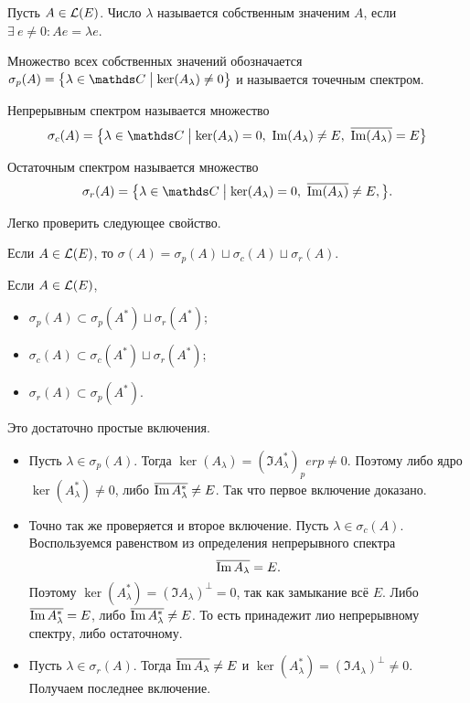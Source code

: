 \begin{Def}
  Пусть $A\in\mathcal L(E)$. Число $\lambda$ называется собственным значеним $A$, если $\exists\ e\ne 0\colon Ae = \lambda e$.

Множество всех собственных значений обозначается $\sigma_p(A) = \big\{\lambda\in\C\bigm| \ker(A_\lambda)\ne0\big\}$ и называется точечным спектром.

Непрерывным спектром называется множество
\[
  \sigma_c(A) = \big\{\lambda\in\C\bigm|
	\ker(A_\lambda)=0,\ 
	\Im(A_\lambda)\ne E,\ 
	\ol{\Im(A_\lambda)} = E\big\}
\]

Остаточным спектром называется множество
\[
  \sigma_r(A) = \big\{\lambda\in\C\bigm|
	\ker(A_\lambda)=0,\ 
	\ol{\Im(A_\lambda)}\ne E,\big\}.
\]
\end{Def}

Легко проверить следующее свойство.
\begin{Ut}
  Если $A\in \mathcal L(E)$, то $\sigma(A) = \sigma_p(A)\sqcup \sigma_c(A)\sqcup \sigma_r(A)$.
\end{Ut}

\begin{Ut}
  Если $A\in\mathcal L(E)$, 
\begin{itemize}
\item 
$\sigma_p(A)\subset \sigma_p(A^*)\sqcup \sigma_r(A^*)$;
\item 
$\sigma_c(A)\subset \sigma_c(A^*)\sqcup \sigma_r(A^*)$;
\item $\sigma_r(A)\subset \sigma_p(A^*)$.
\end{itemize}
\end{Ut}
\begin{Proof}
  Это достаточно простые включения.
\begin{itemize}
\item Пусть $\lambda\in \sigma_p(A)$. Тогда $\ker(A_\lambda) = (\Im A^*_\lambda)_perp\ne0$. Поэтому либо ядро $\ker(A^*_\lambda) \ne 0$, либо $\overline{\mathop{\mathrm{Im}} A^*_\lambda}\ne E$. Так что первое включение доказано.
\item Точно так же проверяется и второе включение. Пусть $\lambda\in \sigma_c(A)$. Воспользуемся равенством из определения непрерывного спектра
\[
  \overline{\mathop{\mathrm{Im}} A_\lambda} = E.
\]
Поэтому $\ker(A^*_\lambda) = (\Im A_\lambda)^\perp = 0$, так как замыкание всё $E$. Либо $\overline{\mathop{\mathrm{Im}} A^*_\lambda} = E$, либо $\overline{\mathop{\mathrm{Im}} A^*_\lambda} \ne E$. То есть принадежит лио непрерывному спектру, либо остаточному.
\item Пусть $\lambda\in \sigma_r(A)$. Тогда $\overline{\mathop{\mathrm{Im}} A_\lambda}\ne E$ и $\ker(A^*_\lambda) = (\Im A_\lambda)^\perp \ne0$. Получаем последнее включение.
\end{itemize}
\end{Proof}

